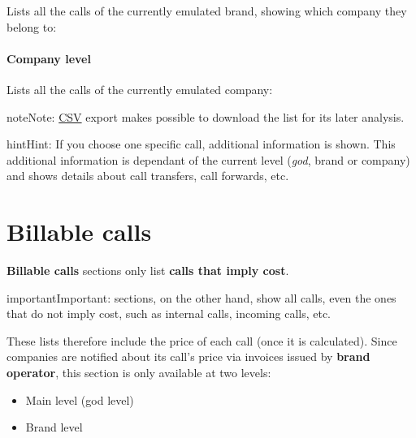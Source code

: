 \documentclass[letterpaper,10pt,english]{sphinxmanual}
\begin{document}
Lists all the calls of the currently emulated brand, showing which company they
belong to:

\noindent{}
\paragraph{Company level}

Lists all the calls of the currently emulated company:

\noindent{}

\begin{notice}{note}{Note:}
\href{https://es.wikipedia.org/wiki/CSV}{CSV} export makes possible to
download the list for its later analysis.
\end{notice}

\begin{notice}{hint}{Hint:}
If you choose one specific call, additional information is shown. This
additional information is dependant of the current level (\emph{god}, brand or
company) and shows details about call transfers, call forwards, etc.
\end{notice}


\section{Billable calls}
\label{billing_and_invoices/billable_calls::doc}\label{billing_and_invoices/billable_calls:billable-calls}\label{billing_and_invoices/billable_calls:id1}
\textbf{Billable calls} sections only list \textbf{calls that imply cost}.

\begin{notice}{important}{Important:}
{\hyperref[billing_and_invoices/call_registry:call\string-registry]{}} sections, on the other hand, show all calls,
even the ones that do not imply cost, such as internal calls, incoming calls,
etc.
\end{notice}

These lists therefore include the price of each call (once it is calculated). Since
companies are notified about its call's price via invoices issued by \textbf{brand operator},
this section is only available at two levels:
\begin{itemize}
\item {} 
Main level (god level)

\item {} 
Brand level

\end{itemize}
\end{document}
